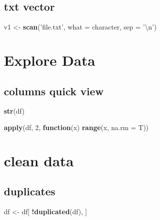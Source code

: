 \documentclass[
]{book}
\newenvironment{Shaded}{\begin{snugshade}}{\end{snugshade}}
\newcommand{\CharTok}[1]{\textcolor[rgb]{0.31,0.60,0.02}{#1}}
\newcommand{\ControlFlowTok}[1]{\textcolor[rgb]{0.13,0.29,0.53}{\textbf{#1}}}
\newcommand{\DataTypeTok}[1]{\textcolor[rgb]{0.13,0.29,0.53}{#1}}
\newcommand{\DecValTok}[1]{\textcolor[rgb]{0.00,0.00,0.81}{#1}}
\newcommand{\KeywordTok}[1]{\textcolor[rgb]{0.13,0.29,0.53}{\textbf{#1}}}
\newcommand{\NormalTok}[1]{#1}
\newcommand{\OperatorTok}[1]{\textcolor[rgb]{0.81,0.36,0.00}{\textbf{#1}}}
\newcommand{\StringTok}[1]{\textcolor[rgb]{0.31,0.60,0.02}{#1}}
\begin{document}
\hypertarget{txt-vector}{%
\section{txt vector}\label{txt-vector}}

\begin{Shaded}
\begin{Highlighting}[]
\NormalTok{v1 <-}\StringTok{ }\KeywordTok{scan}\NormalTok{(}\StringTok{'file.txt'}\NormalTok{, }\DataTypeTok{what =}\NormalTok{ character, }\DataTypeTok{sep =} \StringTok{'}\CharTok{\textbackslash{}n}\StringTok{'}\NormalTok{)}
\end{Highlighting}
\end{Shaded}

\hypertarget{explore-data}{%
\chapter{Explore Data}\label{explore-data}}

\hypertarget{columns-quick-view}{%
\section{columns quick view}\label{columns-quick-view}}

\begin{Shaded}
\begin{Highlighting}[]
\KeywordTok{str}\NormalTok{(df)}

\KeywordTok{apply}\NormalTok{(df, }\DecValTok{2}\NormalTok{, }\ControlFlowTok{function}\NormalTok{(x) }\KeywordTok{range}\NormalTok{(x, }\DataTypeTok{na.rm =}\NormalTok{ T))}
\end{Highlighting}
\end{Shaded}

\hypertarget{clean-data}{%
\chapter{clean data}\label{clean-data}}

\hypertarget{duplicates}{%
\section{duplicates}\label{duplicates}}

\begin{Shaded}
\begin{Highlighting}[]
\NormalTok{df <-}\StringTok{ }\NormalTok{df[ }\OperatorTok{!}\KeywordTok{duplicated}\NormalTok{(df), ]}
\end{Highlighting}
\end{Shaded}
\end{document}
